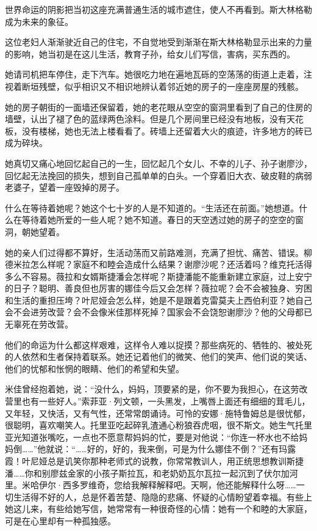 世界命运的阴影把当初这座充满普通生活的城市遮住，使人不再看到。斯大林格勒成为未来的象征。

这位老妇人渐渐驶近自己的住宅，不自觉地受到渐渐在斯大林格勒显示出来的力量的影响，她当初是在这儿生活，教育子孙，给女儿们写信，害病，买东西的。

她请司机把车停住，走下汽车。她很吃力地在遍地瓦砾的空荡荡的街道上走着，注视着断垣残壁，似乎相识又不相识地辨认着邻近她的房子的一座座房屋的残骸。

她的房子朝街的一面墙还保留着，她的老花眼从空空的窗洞里看到了自己的住房的墙壁，认出了褪了色的蓝绿两色涂料。但是几个房间里已经没有地板，没有天花板，没有楼梯，她也无法上楼看看了。砖墙上还留着大火的痕迹，许多地方的砖已成为碎块。

她真切又痛心地回忆起自己的一生，回忆起几个女儿、不幸的儿子、孙子谢廖沙，回忆起无法挽回的损失，想到自己孤单单的白头。一个穿着旧大衣、破皮鞋的病弱老婆子，望着一座毁掉的房子。

什么在等待着她呢？她这个七十岁的人是不知道的。“生活还在前面。”她想道。什么在等待着她所爱的一些人呢？她不知道。春日的天空透过她的房子的空空的窗洞，朝她望着。

她的亲人们过得都不算好，生活动荡而又前路难测，充满了担忧、痛苦、错误。柳德米拉怎么样呢？家庭不和睦会造成什么结果？谢廖沙呢？还活着吗？维克托活得多么不容易。薇拉和女婿斯捷潘会怎样呢？斯捷潘能不能重新建立家庭，过上安宁的日子？聪明、善良但也厉害的娜佳今后又会怎样？薇拉呢？会不会被独身、穷困和生活的重担压垮？叶尼娅会怎么样，她是不是跟着克雷莫夫上西伯利亚？她自己会不会进劳改营？会不会像米佳那样死掉？国家会不会饶恕谢廖沙？他的父母都已无辜死在劳改营。

他们的命运为什么都这样艰难，这样令人难以捉摸？那些病死的、牺牲的、被处死的人依然和生者保持着联系。她还记着他们的微笑、他们的笑声、他们说的笑话、他们的忧郁和怅惘的眼睛、他们的希望和失望。

米佳曾经抱着她，说：“没什么，妈妈，顶要紧的是，你不要为我担心，在这劳改营里也有一些好人。”索菲亚·列文顿，一头黑发，上嘴唇上面还有细细的茸毛儿，又年轻，又快活，又有气性，还常常朗诵诗。可怜的安娜·施特鲁姆总是很忧郁，很聪明，喜欢嘲笑人。托里亚吃起碎乳渣通心粉狼吞虎咽，很不斯文。她生气托里亚光知道张嘴吃，一点也不愿意帮妈妈的忙，要是对他说：“你连一杯水也不给妈妈倒……”他就说：“……好的，好的，我来倒，可是为什么娜佳不倒？”还有玛露霞！叶尼娅总是讥笑你那种老师式的说教，你常常教训人，用正统思想教训斯捷潘……你和别廖兹金家的小孩子斯拉瓦，和老奶奶瓦尔瓦拉一起沉到了伏尔加河里。米哈伊尔·西多罗维奇，您给我解释解释吧。天啊，他还能解释什么呀……一切生活得不好的人，总是怀着苦楚、隐隐的悲痛、怀疑的心情盼望着幸福。有些上她这儿来，有些给她写信，她常常有一种很奇怪的心情：她有一个和睦的大家庭，可是在心里却有一种孤独感。

